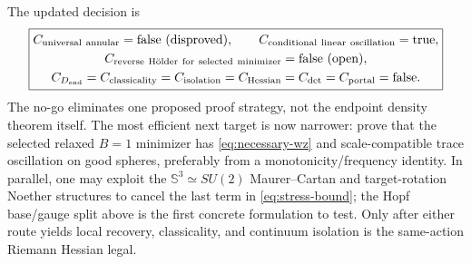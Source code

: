 \documentclass[11pt]{article}
\newcommand{\SSS}{\mathbb S}
\begin{document}
The updated decision is
\begin{equation}
 \boxed{\begin{gathered}
 C_{\rm universal\ annular}=\mathrm{false\ (disproved)},\qquad
 C_{\rm conditional\ linear\ oscillation}=\mathrm{true},\\
 C_{\rm reverse\ H\ddot{o}lder\ for\ selected\ minimizer}=\mathrm{false\ (open)},\\
 C_{D_{\rm end}}=C_{\rm classicality}=C_{\rm isolation}
 =C_{\rm Hessian}=C_{\det}=C_{\rm portal}=\mathrm{false}.
 \end{gathered}}
 \label{eq:decision}
\end{equation}
The no-go eliminates one proposed proof strategy, not the endpoint density
theorem itself.  The most efficient next target is now narrower: prove that
the selected relaxed $B=1$ minimizer has
\eqref{eq:necessary-wz} and scale-compatible trace oscillation on good
spheres, preferably from a monotonicity/frequency identity.  In parallel,
one may exploit the $\SSS^3\simeq SU(2)$ Maurer--Cartan and target-rotation
Noether structures to cancel the last term in \eqref{eq:stress-bound}; the
Hopf base/gauge split above is the first concrete formulation to test.  Only
after either route yields local recovery, classicality, and continuum
isolation is the same-action Riemann Hessian legal.



\end{document}
